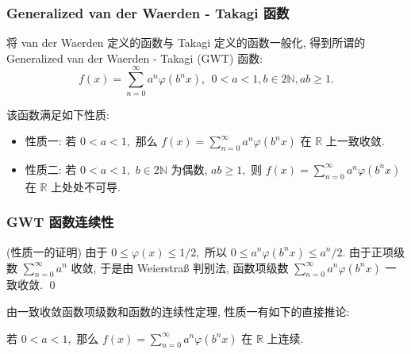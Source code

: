 
\begin{frame}
\frametitle{Generalized van der Waerden - Takagi 函数}

将 van der Waerden 定义的函数与 Takagi 定义的函数一般化, 得到所谓的 Generalized van der Waerden - Takagi (GWT) 函数:
\[f(x) = \sum_{n=0}^\infty a^n \varphi(b^n x), ~~ 0 < a < 1, b \in 2\mathbb{N}, ab \geqslant 1.\]

\pause

该函数满足如下性质:
\begin{itemize}
\item 性质一: 若 $0 < a < 1,$ 那么 $\displaystyle f(x) = \sum_{n=0}^\infty a^n \varphi(b^n x)$ 在 $\mathbb{R}$ 上一致收敛.
\item 性质二: 若 $0 < a < 1,$ $b \in 2\mathbb{N}$ 为偶数, $ab \geqslant 1,$ 则 $\displaystyle f(x) = \sum_{n=0}^\infty a^n \varphi(b^n x)$ 在 $\mathbb{R}$ 上处处不可导.
\end{itemize}

\end{frame}


\begin{frame}
\frametitle{GWT 函数连续性}

\startproof[bg=yellow, fg=red](性质一的证明)
由于 $0 \leqslant \varphi(x) \leqslant 1/2,$
所以 $0 \leqslant a^n \varphi(b^n x) \leqslant a^n/2.$ 由于正项级数 $\displaystyle \sum_{n=0}^{\infty} a^n$ 收敛,
于是由 Weierstraß 判别法, 函数项级数 $\displaystyle \sum_{n=0}^{\infty} a^n \varphi(b^n x)$ 一致收敛. \qed

\pause
\vspace{1em}

由一致收敛函数项级数和函数的连续性定理, 性质一有如下的直接推论:

\begin{cor}
若 $0 < a < 1,$ 那么 $\displaystyle f(x) = \sum_{n=0}^\infty a^n \varphi(b^n x)$ 在 $\mathbb{R}$ 上连续.
\end{cor}

\end{frame}


